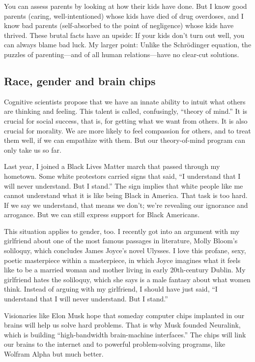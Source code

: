 \documentclass[a4paper]{article}
\begin{document}
You can assess parents by looking at how their kids have done. But I know good parents (caring, well-intentioned) whose kids have died of drug overdoses, and I know bad parents (self-absorbed to the point of negligence) whose kids have thrived. These brutal facts have an upside: If your kids don’t turn out well, you can always blame bad luck. My larger point: Unlike the Schrödinger equation, the puzzles of parenting—and of all human relations—have no clear-cut solutions.
\subsection*{Race, gender and brain chips}
Cognitive scientists propose that we have an innate ability to intuit what others are thinking and feeling. This talent is called, confusingly, ``theory of mind.'' It is crucial for social success, that is, for getting what we want from others. It is also crucial for morality. We are more likely to feel compassion for others, and to treat them well, if we can empathize with them. But our theory-of-mind program can only take us so far.

Last year, I joined a Black Lives Matter march that passed through my hometown. Some white protestors carried signs that said, ``I understand that I will never understand. But I stand.'' The sign implies that white people like me cannot understand what it is like being Black in America. That task is too hard. If we say we understand, that means we don’t; we’re revealing our ignorance and arrogance. But we can still express support for Black Americans.

This situation applies to gender, too. I recently got into an argument with my girlfriend about one of the most famous passages in literature, Molly Bloom’s soliloquy, which concludes James Joyce’s novel Ulysses. I love this profane, sexy, poetic masterpiece within a masterpiece, in which Joyce imagines what it feels like to be a married woman and mother living in early 20th-century Dublin. My girlfriend hates the soliloquy, which she says is a male fantasy about what women think. Instead of arguing with my girlfriend, I should have just said, ``I understand that I will never understand. But I stand.''

Visionaries like Elon Musk hope that someday computer chips implanted in our brains will help us solve hard problems. That is why Musk founded Neuralink, which is building ``high-bandwidth brain-machine interfaces.'' The chips will link our brains to the internet and to powerful problem-solving programs, like Wolfram Alpha but much better.
\end{document}
